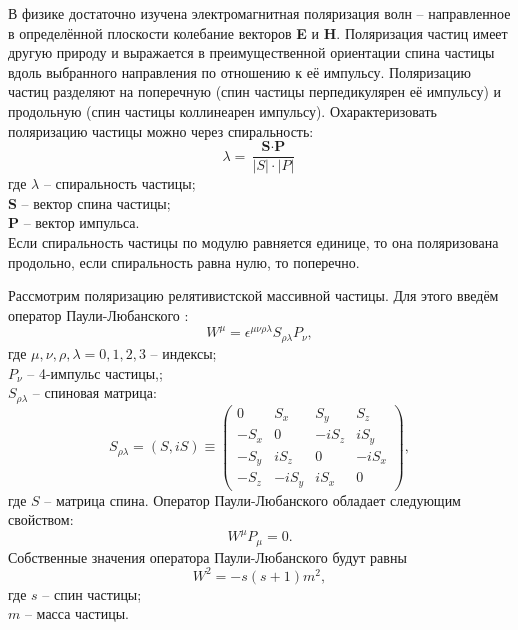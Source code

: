 \documentclass{extarticle}
\begin{document}
 В физике достаточно изучена электромагнитная поляризация волн – направленное в определённой плоскости колебание векторов \textbf{E} и \textbf{H}. Поляризация частиц имеет другую природу и выражается в преимущественной ориентации спина частицы вдоль выбранного направления по отношению к её импульсу. Поляризацию частиц разделяют на поперечную (спин частицы перпедикулярен её импульсу) и продольную (спин частицы коллинеарен импульсу). 
 Охарактеризовать поляризацию частицы можно через спиральность:
 \begin{equation}
     \lambda = \frac{\textbf{S} \cdot \textbf{P}}{|S|\cdot |P|}
 \end{equation}
где $\lambda$ -- спиральность частицы; \\ \textbf{S} – вектор спина частицы; \\ \textbf{P} – вектор импульса. \\ 
Если спиральность частицы по модулю равняется единице, то она поляризована продольно, если спиральность равна нулю, то поперечно. 

Рассмотрим поляризацию релятивистской массивной частицы. Для этого введём оператор Паули-Любанского \cite{banerjee}:
\begin{equation}
	W^\mu = \epsilon^{\mu\nu\rho\lambda}S_{\rho\lambda}P_\nu,
\end{equation}
где $\mu, \nu, \rho, \lambda = 0, 1, 2, 3$ -- индексы; \\ $P_\nu$ -- 4-импульс частицы,; \\ $S_{\rho\lambda}$ -- спиновая матрица:
\begin{equation}
	S_{\rho\lambda} = (S, iS) \equiv \begin{pmatrix}
		0&S_x&S_y&S_z\\-S_x&0&-iS_z&iS_y\\-S_y&iS_z&0&-iS_x\\-S_z&-iS_y&iS_x&0
	\end{pmatrix},
\end{equation}
где $S$ -- матрица спина. Оператор Паули-Любанского обладает следующим свойством:
\begin{equation}
	W^\mu P_\mu = 0.
\end{equation}
Собственные значения оператора Паули-Любанского будут равны
\begin{equation}
	W^2 = -s(s+1)m^2,
\end{equation}
где $s$ -- спин частицы; \\ $m$ -- масса частицы.
\end{document}

